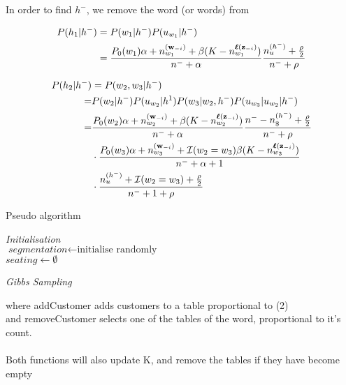 In order to find $h^-$, we remove the word (or words) from 

\begin{align}
P(h_1 | h^-) &= P(w_1|h^-)P(u_{w_1} | h^{-}) \\
&= \dfrac{P_0(w_1)\alpha + n_{w_1}^{(\bm{\mathbf{w}}_{-i})}+ \beta (K - n_{w_1}^{\bm{\mathbf{\ell}}(\bm{\mathbf{z}}_{-i})})}{n^- + \alpha}
\dfrac{n_u^{(h^-)} + \frac{\rho}{2}}{n^- + \rho}
\end{align}

\begin{align}
P(h_2 | h^-) &= P(w_2,w_3|h^-)\\
=&P(w_2|h^-)P(u_{w_2}|h^1)P(w_3 | w_2,h^-)P(u_{w_3}|u_{w_2}|h^-) \\
=& \dfrac{P_0(w_2)\alpha + n_{w_2}^{(\bm{\mathbf{w}}_{-i})}+ \beta (K - n_{w_2}^{\bm{\mathbf{\ell}}(\bm{\mathbf{z}}_{-i})})}{n^- + \alpha}
\dfrac{n^- - n_\$^{(h^-)} + \frac{\rho}{2}}{n^- + \rho} \\
&\cdot 
\dfrac{P_0(w_3)\alpha + n_{w_3}^{(\bm{\mathbf{w}}_{-i})}+ \mathcal{I}(w_2 = w_3) \beta (K - n_{w_3}^{\bm{\mathbf{\ell}}(\bm{\mathbf{z}}_{-i})})}{n^- + \alpha + 1} \\
&\cdot
\dfrac{n_u^{(h^-)} + \mathcal{I}(w_2 = w_3)  + \frac{\rho}{2}}{n^- + 1 + \rho}
\end{align}



\begin{algorithm}[H]
	\caption{Pseudo algorithm}
    \label{alg:quad}
    \nonl  \SetSideCommentLeft \emph{Initialisation} \\
    $\textit{segmentation} \gets \text{initialise randomly}$ \\ 
    $seating \gets \emptyset$ \\
    
     
     \nonl \SetSideCommentLeft \emph{Gibbs Sampling}

  \end{algorithm}
  
  	
where addCustomer adds customers to a table proportional to (2) \\
and removeCustomer selects one of the tables of the word, proportional to it's count. \\
\\
Both functions will also update K, and remove the tables if they have become empty